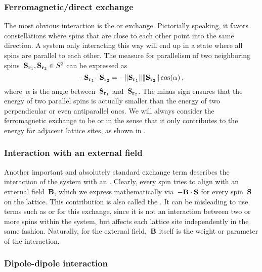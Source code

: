\subsubsection{Ferromagnetic/direct exchange}

The most obvious interaction is the  or 
exchange. Pictorially speaking, it favors constellations where spins that are
close to each other point into the same direction. A system only interacting
this way will end up in a state where all spins are parallel to each other. The
measure for parallelism of two neighboring spins~$\S_{\r_1}, \S_{\r_2} \in S^2$
can be expressed as
%
\begin{equation}
  -\S_{\r_1} \cdot \S_{\r_2} =
  -\norm{\S_{\r_1}} \norm{\S_{\r_2}} \cos(\alpha) \:,
\end{equation}
%
where~$\alpha$ is the angle between~$\S_{\r_1}$ and~$\S_{\r_2}$. The minus sign
ensures that the energy of two parallel spins is actually smaller than the
energy of two perpendicular or even antiparallel ones. We will always consider
the ferromagnetic exchange to be  or  in
the sense that it only contributes to the energy for adjacent lattice sites, as
shown in .

\subsubsection{Interaction with an external field}

Another important and absolutely standard exchange term describes the
interaction of the system with an . Clearly,
every spin tries to align with an external field~$\B$, which we express
mathematically via~$-\B \cdot \S$ for every spin~$\S$ on the lattice. This
contribution is also called the . It can be misleading to
use terms such as  or  for this
exchange, since it is not an interaction between two or more spins within the
system, but affects each lattice site independently in the same fashion.
Naturally, for the external field,~$\B$ itself is the weight or parameter of the
interaction.

\subsubsection{Dipole-dipole interaction}

